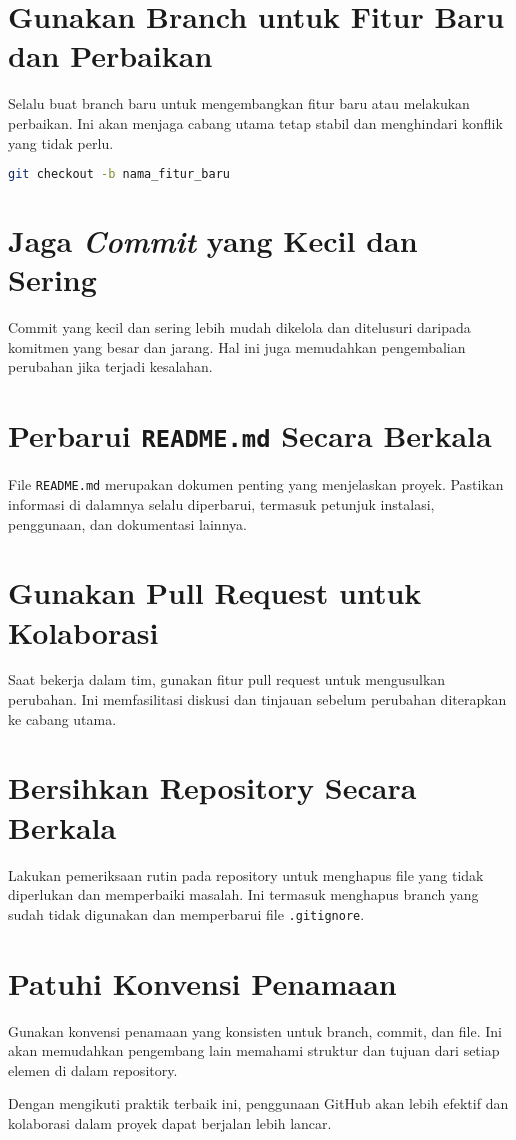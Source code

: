 \section{Gunakan Branch untuk Fitur Baru dan Perbaikan}
Selalu buat branch baru untuk mengembangkan fitur baru atau melakukan perbaikan. Ini akan menjaga cabang utama tetap stabil dan menghindari konflik yang tidak perlu.
\begin{lstlisting}[language=bash]
	git checkout -b nama_fitur_baru
\end{lstlisting}

\section{Jaga \textit{Commit} yang Kecil dan Sering}
Commit yang kecil dan sering lebih mudah dikelola dan ditelusuri daripada komitmen yang besar dan jarang. Hal ini juga memudahkan pengembalian perubahan jika terjadi kesalahan.

\section{Perbarui \texttt{README.md} Secara Berkala}
File \texttt{README.md} merupakan dokumen penting yang menjelaskan proyek. Pastikan informasi di dalamnya selalu diperbarui, termasuk petunjuk instalasi, penggunaan, dan dokumentasi lainnya.

\section{Gunakan Pull Request untuk Kolaborasi}
Saat bekerja dalam tim, gunakan fitur pull request untuk mengusulkan perubahan. Ini memfasilitasi diskusi dan tinjauan sebelum perubahan diterapkan ke cabang utama.

\section{Bersihkan Repository Secara Berkala}
Lakukan pemeriksaan rutin pada repository untuk menghapus file yang tidak diperlukan dan memperbaiki masalah. Ini termasuk menghapus branch yang sudah tidak digunakan dan memperbarui file \texttt{.gitignore}.

\section{Patuhi Konvensi Penamaan}
Gunakan konvensi penamaan yang konsisten untuk branch, commit, dan file. Ini akan memudahkan pengembang lain memahami struktur dan tujuan dari setiap elemen di dalam repository.

Dengan mengikuti praktik terbaik ini, penggunaan GitHub akan lebih efektif dan kolaborasi dalam proyek dapat berjalan lebih lancar.
